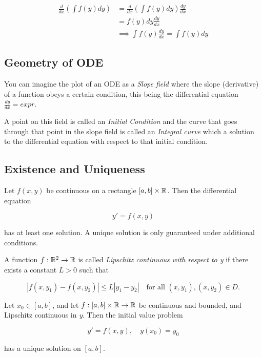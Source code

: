 \begin{align*}
\frac{d}{dx} \left( \int f(y) dy \right) &= \frac{d}{dx} \left( \int f(y) dy \right) \frac{dy}{dx}\\
                                         &= f(y) dy \frac{dy}{dx}\\
                                         &\implies \int f(y) \frac{dy}{dx} = \int f(y) dy
\end{align*}
\QED

\subsection{Geometry of ODE}

You can imagine the plot of an ODE as a \emph{Slope field} where the slope (derivative) of a function
obeys a certain condition, this being the differential equation \(\frac{dy}{dx} = expr\).
\vspace{\baselineskip}

A point on this field is called an \emph{Initial Condition} and the curve that goes through
that point in the slope field is called an \emph{Integral curve} which a solution to the differential
equation with respect to that initial condition.

\subsection{Existence and Uniqueness}

Let \( f(x, y) \) be continuous on a rectangle \( [a, b] \times \mathbb{R} \). Then the differential 
equation

\[
    y' = f(x, y)
\]

has at least one solution. A unique solution is only guaranteed under additional conditions.

A function \( f : \mathbb{R}^2 \to \mathbb{R} \) is called 
\emph{Lipschitz continuous with respect to \emph{y}} if there exists a constant \( L > 0 \) such that

\[
    |f(x, y_1) - f(x, y_2)| \leq L |y_1 - y_2|
    \quad \text{for all } (x, y_1), (x, y_2) \in D.
\]

Let \( x_0 \in [a, b] \), and let \( f : [a, b] \times \mathbb{R} \to \mathbb{R} \) be continuous 
and bounded, and Lipschitz continuous in \emph{y}. Then the initial value problem

\[
    y' = f(x, y), \quad y(x_0) = y_0
\]

has a unique solution on \( [a, b] \).
\vspace{\baselineskip}

